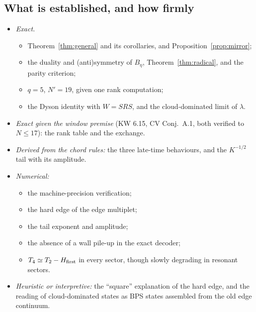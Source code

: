 \documentclass[11pt]{article}
\newcommand{\Np}{N'}
\theoremstyle{plain}
\theoremstyle{remark}
\numberwithin{equation}{section}
\begin{document}
\subsection{What is established, and how firmly}
\begin{itemize}\itemsep1pt
\item \emph{Exact.}
\begin{itemize}\itemsep0pt
\item Theorem~\ref{thm:general} and its corollaries, and Proposition~\ref{prop:mirror};
\item the duality and (anti)symmetry of $B_\eta$, Theorem~\ref{thm:radical}, and the parity criterion;
\item $q=5$, $\Np=19$, given one rank computation;
\item the Dyson identity with $W=SRS$, and the cloud-dominated limit of $\lambda$.
\end{itemize}
\item \emph{Exact given the window premise} (KW 6.15, CV Conj.~A.1, both verified to $N\le17$): the rank table and the
exchange.
\item \emph{Derived from the chord rules:} the three late-time behaviours, and the $K^{-1/2}$ tail with its amplitude.
\item \emph{Numerical:}
\begin{itemize}\itemsep0pt
\item the machine-precision verification;
\item the hard edge of the edge multiplet;
\item the tail exponent and amplitude;
\item the absence of a wall pile-up in the exact decoder;
\item $T_4\simeq T_2-H_{\rm first}$ in every sector, though slowly degrading in resonant sectors.
\end{itemize}
\item \emph{Heuristic or interpretive:} the ``square'' explanation of the hard edge, and the reading of cloud-dominated
states as BPS states assembled from the old edge continuum.
\end{itemize}
\end{document}
